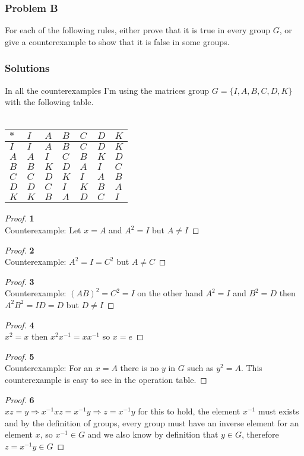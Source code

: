 \documentclass[11pt]{article}
\begin{document}
	\subsubsection*{Problem B}
		For each of the following rules, either prove that it is true in every group $G$, or give a counterexample to show that it is false in some groups.
	\subsubsection*{Solutions}
		In all the counterexamples I'm using the matrices group $G = \{I,A,B,C,D,K\}$ with the following table.\\\\
		\begin{adjustbox}{max width=\textwidth,center}
		\begin{tabular}{l|llllll}
			$*$ & $I$ & $A$ & $B$ & $C$ & $D$ & $K$ \\ \hline
			$I$ & $I$ & $A$ & $B$ & $C$ & $D$ & $K$ \\
			$A$ & $A$ & $I$ & $C$ & $B$ & $K$ & $D$ \\
			$B$ & $B$ & $K$ & $D$ & $A$ & $I$ & $C$ \\
			$C$ & $C$ & $D$ & $K$ & $I$ & $A$ & $B$ \\
			$D$ & $D$ & $C$ & $I$ & $K$ & $B$ & $A$ \\
			$K$ & $K$ & $B$ & $A$ & $D$ & $C$ & $I$ \\
		\end{tabular}
		\end{adjustbox}
		\begin{proof}{\textbf{1}}\\
			Counterexample: Let $x=A$ and $A^2=I$ but $A \neq I$
		\end{proof}
		\begin{proof}{\textbf{2}}\\
			Counterexample: $A^2=I=C^2$ but $A \neq C$
		\end{proof}
		\begin{proof}{\textbf{3}}\\
			Counterexample: $(AB)^2=C^2=I$ on the other hand $A^2=I$ and $B^2=D$ then $A^2B^2=ID=D$ but $D \neq I$
		\end{proof}
		\begin{proof}{\textbf{4}}\\
			$x^2=x$ then $x^2x^{-1}=xx^{-1}$ so $x=e$
		\end{proof}
		\begin{proof}{\textbf{5}}\\
			Counterexample: For an $x=A$ there is no $y$ in $G$ such as $y^2=A$. This counterexample is easy to see in the operation table.
		\end{proof}
		\begin{proof}{\textbf{6}}\\
			$xz=y \Rightarrow x^{-1}xz=x^{-1}y \Rightarrow z=x^{-1}y$ for this to hold, the element $x^{-1}$ must exists and by the definition of groups, every group must have an inverse element for an element $x$, so $x^{-1} \in G$ and we also know by definition that $y \in G$, therefore $z=x^{-1}y \in G$
		\end{proof}
\cleardoublepage
\end{document}
